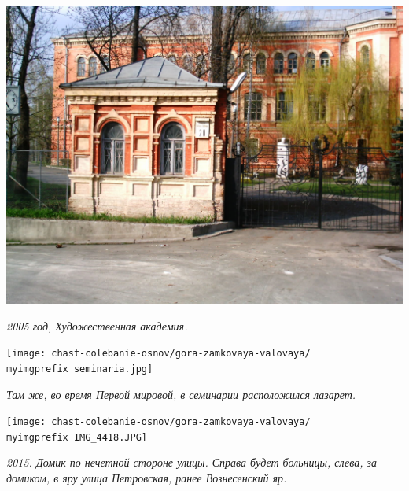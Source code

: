 \begin{center}
\includegraphics[width=0.86\linewidth]{chast-colebanie-osnov/gora-zamkovaya-valovaya/imag0006.jpg}

\textit{2005 год, Художественная академия.}
\end{center}

\newpage

\begin{center}
\texttt{[image: chast-colebanie-osnov/gora-zamkovaya-valovaya/\\myimgprefix seminaria.jpg]}

\textit{Там же, во время Первой мировой, в семинарии расположился лазарет.}
\end{center}

\begin{center}
\texttt{[image: chast-colebanie-osnov/gora-zamkovaya-valovaya/\\myimgprefix IMG\_4418.JPG]}

\textit{2015. Домик по нечетной стороне улицы. Справа будет больницы, слева, за домиком, в яру улица Петровская, ранее Вознесенский яр.}
\end{center}

